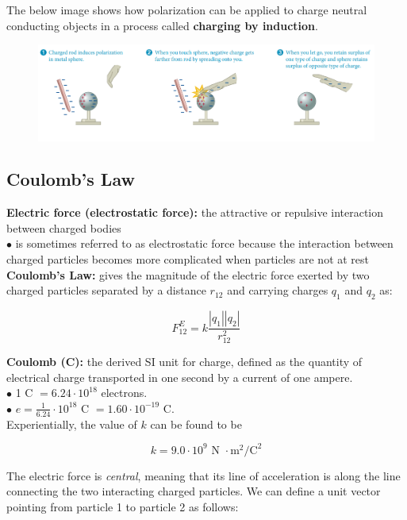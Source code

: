         The below image shows how polarization can be applied to charge neutral conducting objects in a process called \textbf{charging by induction}.

        \begin{figure}[hbt!]
            \centering
            \includegraphics[scale=0.75]{Resources/22.4_Induction}
        \end{figure}

    \subsection{Coulomb's Law}      %

        \textbf{Electric force (electrostatic force):} the attractive or repulsive interaction between charged bodies \\
        $\bullet$ is sometimes referred to as electrostatic force because the interaction between charged particles becomes more complicated when particles are not at rest
        \textbf{Coulomb's Law:} gives the magnitude of the electric force exerted by two charged particles separated by a distance $r_{12}$ and carrying charges $q_1$ and $q_2$ as:

        \[
            F^E_{12} = k\frac{|q_1||q_2|}{r^2_{12}}
        \]

        \textbf{Coulomb (C):} the derived SI unit for charge, defined as the quantity of electrical charge transported in one second by a current of one ampere. \\
        $\bullet$ 1 C $=6.24\cdot 10^{18}$ electrons. \\
        $\bullet$ $e = \frac{1}{6.24}\cdot 10^{18}$ C $=1.60 \cdot 10^{-19}$ C. \\

        Experientially, the value of $k$ can be found to be

        \[
            k = 9.0 \cdot 10^9 \text{ N }\cdot \text{m}^2/\text{C}^2
        \]

        The electric force is \textit{central}, meaning that its line of acceleration is along the line connecting the two interacting charged particles. We can define a unit vector pointing from particle 1 to particle 2
        as follows:

